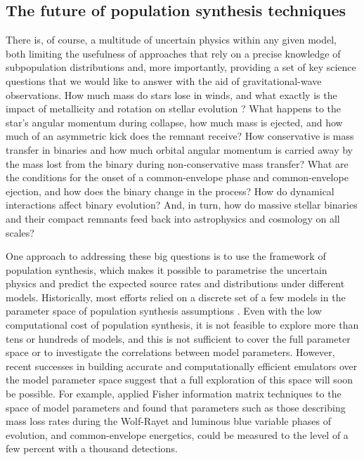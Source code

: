 \documentclass[review]{elsarticle}
\begin{document}
\subsection{The future of population synthesis techniques}
There is, of course, a multitude of uncertain physics within any given model, both limiting the usefulness of approaches that rely on a precise knowledge of subpopulation distributions and, more importantly, providing a set of key science questions that we would like to answer with the aid of gravitational-wave observations.  How much mass do stars lose in winds, and what exactly is the impact of metallicity and rotation on stellar evolution \citep{LimongiChieffi:2018}?  What happens to the star's angular momentum during collapse, how much mass is ejected, and how much of an asymmetric kick does the remnant receive? How conservative is mass transfer in binaries and how much orbital angular momentum is carried away by the mass lost from the binary during non-conservative mass transfer?  What are the conditions for the onset of a common-envelope phase and common-envelope ejection, and how does the binary change in the process?   How do dynamical interactions affect binary evolution?  And, in turn, how do massive stellar binaries and their compact remnants feed back into astrophysics and cosmology on all scales?

One approach to addressing these big questions is to use the framework of population synthesis, which makes it possible to parametrise the uncertain physics and predict the expected source rates and distributions under different models.  Historically, most efforts relied on a discrete set of a few models in the parameter space of population synthesis assumptions \citep[e.g.,][]{Dominik:2012,Stevenson:2015}.  Even with the low computational cost of population synthesis, it is not feasible to explore more than  tens or hundreds of models, and this is not sufficient to cover the full parameter space or to investigate the correlations between model parameters.  However, recent successes in building accurate and computationally efficient emulators over the model parameter space \citep{Barrett:2017,TaylorGerosa:2018,Wong:2020,Lin:2021} suggest that a full exploration of this space will soon be possible. For example, \citet{Barrett:2017FIM} applied Fisher information matrix techniques to the space of model parameters and found that parameters such as those describing mass loss rates during the Wolf-Rayet and luminous blue variable phases of evolution, and common-envelope energetics, could be measured to the level of a few percent with a thousand detections. 
\end{document}
